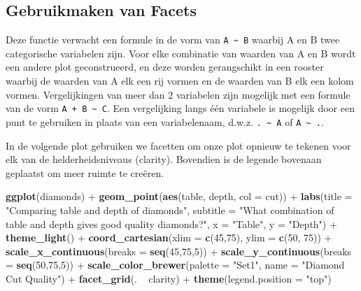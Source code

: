 \documentclass[]{tufte-book}
\newenvironment{Shaded}{}{}
\newcommand{\DataTypeTok}[1]{\textcolor[rgb]{0.56,0.13,0.00}{#1}}
\newcommand{\DecValTok}[1]{\textcolor[rgb]{0.25,0.63,0.44}{#1}}
\newcommand{\KeywordTok}[1]{\textcolor[rgb]{0.00,0.44,0.13}{\textbf{#1}}}
\newcommand{\NormalTok}[1]{#1}
\newcommand{\OperatorTok}[1]{\textcolor[rgb]{0.40,0.40,0.40}{#1}}
\newcommand{\StringTok}[1]{\textcolor[rgb]{0.25,0.44,0.63}{#1}}
\begin{document}
\hypertarget{gebruikmaken-van-facets}{%
\subsection{Gebruikmaken van Facets}\label{gebruikmaken-van-facets}}

Deze functie verwacht een formule in de vorm van \texttt{A\ \textasciitilde{}\ B} waarbij A en B twee categorische variabelen zijn. Voor elke combinatie van waarden van A en B wordt een andere plot geconstrueerd, en deze worden gerangschikt in een rooster waarbij de waarden van A elk een rij vormen en de waarden van B elk een kolom vormen. Vergelijkingen van meer dan 2 variabelen zijn mogelijk met een formule van de vorm \texttt{A\ +\ B\ \textasciitilde{}\ C}. Een vergelijking langs één variabele is mogelijk door een punt te gebruiken in plaats van een variabelenaam, d.w.z. \texttt{.\ \textasciitilde{}\ A} of \texttt{A\ \textasciitilde{}\ .}.

In de volgende plot gebruiken we facetten om onze plot opnieuw te tekenen voor elk van de helderheidsniveaus (clarity). Bovendien is de legende bovenaan geplaatst om meer ruimte te creëren.

\begin{Shaded}
\begin{Highlighting}[]
\KeywordTok{ggplot}\NormalTok{(diamonds) }\OperatorTok{+}
\StringTok{    }\KeywordTok{geom_point}\NormalTok{(}\KeywordTok{aes}\NormalTok{(table, depth, }\DataTypeTok{col =}\NormalTok{ cut)) }\OperatorTok{+}\StringTok{ }
\StringTok{    }\KeywordTok{labs}\NormalTok{(}\DataTypeTok{title =} \StringTok{"Comparing table and depth of diamonds"}\NormalTok{,}
         \DataTypeTok{subtitle =} \StringTok{"What combination of table and depth gives good quality diamonds?"}\NormalTok{,}
         \DataTypeTok{x =} \StringTok{"Table"}\NormalTok{,}
         \DataTypeTok{y =} \StringTok{"Depth"}\NormalTok{) }\OperatorTok{+}
\StringTok{    }\KeywordTok{theme_light}\NormalTok{() }\OperatorTok{+}
\StringTok{    }\KeywordTok{coord_cartesian}\NormalTok{(}\DataTypeTok{xlim =} \KeywordTok{c}\NormalTok{(}\DecValTok{45}\NormalTok{,}\DecValTok{75}\NormalTok{), }\DataTypeTok{ylim =} \KeywordTok{c}\NormalTok{(}\DecValTok{50}\NormalTok{, }\DecValTok{75}\NormalTok{)) }\OperatorTok{+}
\StringTok{    }\KeywordTok{scale_x_continuous}\NormalTok{(}\DataTypeTok{breaks =} \KeywordTok{seq}\NormalTok{(}\DecValTok{45}\NormalTok{,}\DecValTok{75}\NormalTok{,}\DecValTok{5}\NormalTok{)) }\OperatorTok{+}
\StringTok{    }\KeywordTok{scale_y_continuous}\NormalTok{(}\DataTypeTok{breaks =} \KeywordTok{seq}\NormalTok{(}\DecValTok{50}\NormalTok{,}\DecValTok{75}\NormalTok{,}\DecValTok{5}\NormalTok{)) }\OperatorTok{+}
\StringTok{    }\KeywordTok{scale_color_brewer}\NormalTok{(}\DataTypeTok{palette =} \StringTok{"Set1"}\NormalTok{, }\DataTypeTok{name =} \StringTok{"Diamond Cut Quality"}\NormalTok{) }\OperatorTok{+}
\StringTok{    }\KeywordTok{facet_grid}\NormalTok{(. }\OperatorTok{~}\StringTok{ }\NormalTok{clarity) }\OperatorTok{+}
\StringTok{    }\KeywordTok{theme}\NormalTok{(}\DataTypeTok{legend.position =} \StringTok{"top"}\NormalTok{)}
\end{Highlighting}
\end{Shaded}
\end{document}
